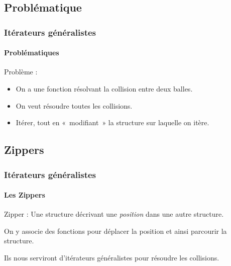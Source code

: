 \documentclass[xcolor=x11names,compress,11pt]{beamer}
\renewcommand{\(}{\begin{columns}}
\renewcommand{\)}{\end{columns}}
\newcommand{\<}[1]{\begin{column}{#1}}
\renewcommand{\>}{\end{column}}
\begin{document}
\begin{frame}
\begin{columns}
\begin{column}[r]{0.65\textwidth}
\begin{itemize}
  \end{itemize}

\end{column}
\end{columns}

\end{frame}

\subsection*{Problématique}

\begin{frame}
  \frametitle{Itérateurs généralistes}
  \framesubtitle{Problématiques}

  Problème : 
  \begin{itemize}
  \item On a une fonction résolvant la collision entre deux balles.
  \item On veut résoudre toutes les collisions.
  \item Itérer, tout en «~modifiant~» la structure sur laquelle on
    itère.
  \end{itemize}
\end{frame}

\subsection*{Zippers}

\begin{frame}
  \frametitle{Itérateurs généralistes}
  \framesubtitle{Les Zippers}

  \begin{block}{Zipper :}
    Une structure décrivant une \emph{position} dans une autre structure.

    On y associe des fonctions pour déplacer la position et ainsi
    parcourir la structure.
  \end{block}

  \begin{block}{}
    Ils nous serviront d'itérateurs généralistes pour résoudre les
    collisions.
  \end{block}
\end{frame}
\end{document}
